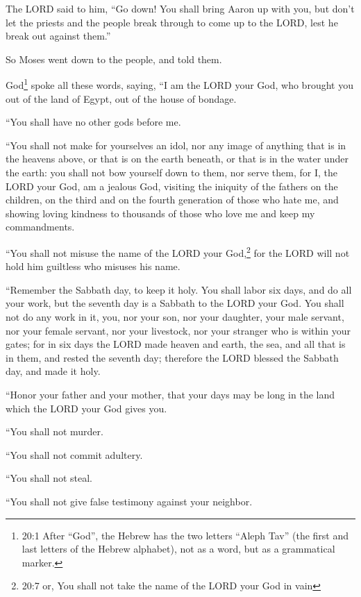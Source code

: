 \myverse{}The LORD said to him, “Go down! You shall bring Aaron up with
you, but don’t let the priests and the people break through to come up to the LORD, lest he break out
against them.”


\myverse{}So Moses went down to the people, and told them.


\mychapter{} \myverse*{}God\footnote{20:1 After “God”, the Hebrew has the two letters “Aleph Tav” (the first and last letters of the Hebrew alphabet), not as a word, but as a grammatical marker.} spoke all these words, saying,
\myverse{}“I am the LORD your God, who brought you out of the land of Egypt, out of the
house of bondage.


\myverse{}“You shall have no other gods before me.


\myverse{}“You shall not make for yourselves an idol, nor any image of anything
that is in the heavens above, or that is on the earth beneath, or that is in the water under the earth:
\myverse{}you shall not bow yourself down to them, nor serve them, for I, the LORD your
God, am a jealous God, visiting the iniquity of the fathers on the children, on the third and on the fourth
generation of those who hate me,
\myverse{}and showing loving kindness to thousands of those who love me and keep my commandments.


\myverse{}“You shall not misuse the name of the LORD your God,\footnote{20:7 or, You shall not take the name of the LORD your God in vain} for the LORD will not hold
him guiltless who misuses his name.


\myverse{}“Remember the Sabbath day, to keep it holy.
\myverse{}You shall labor six days, and do all your work,
\myverse{}but the seventh day is a Sabbath to the LORD your God. You shall not do any
work in it, you, nor your son, nor your daughter, your male servant, nor your female servant, nor your
livestock, nor your stranger who is within your gates;
\myverse{}for in six days the LORD made heaven and earth, the sea, and all that is
in them, and rested the seventh day; therefore the LORD blessed the Sabbath day, and made it holy.


\myverse{}“Honor your father and your mother, that your days may be long
in the land which the LORD your God gives you.


\myverse{}“You shall not murder.


\myverse{}“You shall not commit adultery.


\myverse{}“You shall not steal.


\myverse{}“You shall not give false testimony against your neighbor.


